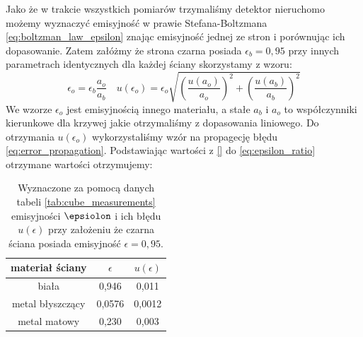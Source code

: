 \documentclass[12pt]{article}
\begin{document}
Jako że w trakcie wszystkich pomiarów trzymaliśmy detektor nieruchomo możemy wyznaczyć emisyjność w prawie Stefana-Boltzmana \eqref{eq:boltzman_law_epsilon} znając emisyjność jednej ze stron i porównując ich dopasowanie.
Zatem załóżmy że strona czarna posiada $\epsilon_b = 0{,}95$ przy innych parametrach identycznych dla każdej ściany skorzystamy z wzoru:
\begin{equation}
    \epsilon_o = \epsilon_b \frac{a_o}{a_b} \quad u(\epsilon_o) = \epsilon_o \sqrt{(\frac{u(a_o)}{a_o})^2 + (\frac{u(a_b)}{a_b})^2}
    \label{eq:epsilon_ratio}
\end{equation}
We wzorze $\epsilon_o$ jest emisyjnością innego materiału, a stałe $a_b$ i $a_o$ to współczynniki kierunkowe dla krzywej jakie otrzymaliśmy z dopasowania liniowego. Do otrzymania $u(\epsilon_o)$ wykorzystaliśmy wzór na propagecję błędu \eqref{eq:error_propagation}.
Podstawiając wartości z \eqref{} do \eqref{eq:epsilon_ratio} otrzymane wartości otrzymujemy:

\begin{table}[H]
    \centering
    \begin{tabular}{c|cc}
        \toprule
        materiał ściany & $\epsilon$ & $u(\epsilon)$ \\
        \midrule
        biała & 0{,}946 & 0{,}011 \\
        metal błyszczący  & 0{,}0576 & 0{,}0012 \\
        metal matowy & 0{,}230 & 0{,}003 \\
        \bottomrule
    \end{tabular}
    \caption{Wyznaczone za pomocą danych tabeli \ref{tab:cube_measurements} emisyjności $\epsiolon$ i ich błędu $u(\epsilon)$ przy założeniu że czarna ściana posiada emisyjność $\epsilon = 0{,}95$.}
    \label{tab:materials_emisity}
\end{table}
\end{document}
